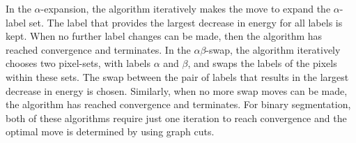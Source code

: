 In the $\alpha$-expansion, the algorithm iteratively makes the move to expand the $\alpha$-label set. The label that provides the largest decrease in energy for all labels is kept. When no further label changes can be made, then  the algorithm has reached convergence and terminates.
In the $\alpha\beta$-swap, the algorithm iteratively chooses two pixel-sets, with labels $\alpha$ and $\beta$, and swaps the labels of the pixels within these sets. The swap between the pair of labels that results in the largest decrease in energy is chosen. Similarly, when no more swap moves can be made, the algorithm has reached convergence and terminates. For binary segmentation, both of these algorithms require just one iteration to reach convergence and the optimal move is determined by using graph cuts.

